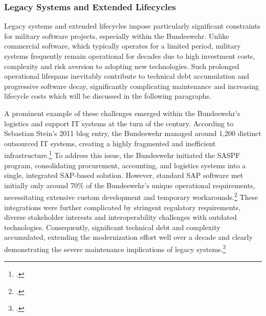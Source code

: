 \subsubsection{Legacy Systems and Extended Lifecycles}
Legacy systems and extended lifecycles impose particularly significant constraints for military software projects, especially within the Bundeswehr. 
Unlike commercial software, which typically operates for a limited period, military systems frequently remain operational for decades due to high investment costs, complexity and risk aversion to adopting new technologies. Such prolonged operational 
lifespans inevitably contribute to technical debt accumulation and progressive software decay, significantly complicating maintenance and increasing lifecycle costs which will be discussed in the following paragraphs.

A prominent example of these challenges emerged within the Bundeswehr's logistics and support IT systems at the turn of the century. According to Sebastian Stein's 2011 blog entry,
the Bundeswehr managed around 1,200 distinct outsourced IT systems, creating a highly fragmented and inefficient infrastructure.\footcite{steinBusinessProcessManagement2011} To address this issue, the Bundeswehr initiated the \ac{SASPF} program, consolidating procurement, accounting, 
and logistics systems into a single, integrated SAP-based solution. However, standard SAP software met initially only around 70\% of the Bundeswehr's unique operational requirements, necessitating extensive custom development and temporary workarounds.\footcite{steinBusinessProcessManagement2011} These integrations were further 
complicated by stringent regulatory requirements, diverse stakeholder interests and interoperability challenges with outdated technologies. Consequently, significant technical debt and complexity accumulated, extending the modernization effort well over a decade and clearly demonstrating the severe maintenance implications of legacy systems.\footcite{steinBusinessProcessManagement2011}


